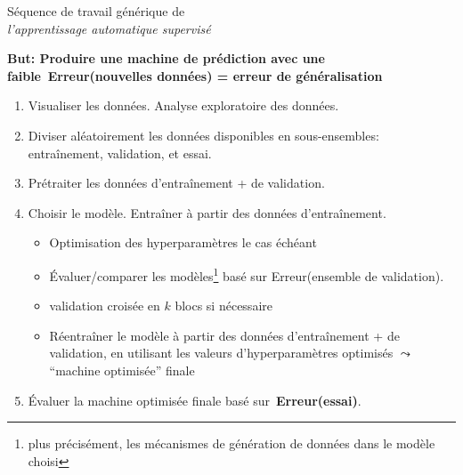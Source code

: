 
\renewcommand*{\thefootnote}{\fnsymbol{footnote}}
\setcounter{footnote}{1}


\begin{frame}{\vskip -0.5cm \normalsize S\'equence de travail g\'en\'erique de\\ \textit{\Large l'apprentissage automatique supervis\'e}}

\footnotesize

\begin{center}
\vskip -0.3cm
\textbf{\normalsize But: Produire une machine de pr\'ediction avec une\\faible \,{\color{blue}Erreur(nouvelles donn\'ees) = erreur de g\'en\'eralisation}}
\end{center}

\vskip -0.2cm
\begin{enumerate}
\item
	Visualiser les donn\'ees. Analyse exploratoire des donn\'ees.

\vskip -0.25cm
\item
	Diviser al\'eatoirement les donn\'ees disponibles en sous-ensembles:
	{\color{red}entra\^inement}, {\color{red}validation}, et {\color{red}essai}.

\vskip -0.25cm
\item
	Pr\'etraiter les donn\'ees d'entra\^inement + de validation.%

\vskip -0.25cm
\item
	Choisir le mod\`ele. Entra\^iner \`a partir des donn\'ees d'entra\^inement.
	{\scriptsize\begin{itemize}
	\item
		\vskip -0.1cm
		{\scriptsize{\color{red}Optimisation des hyperparam\`etres} le cas \'ech\'eant}
	\item
		{\scriptsize \'Evaluer/comparer les mod\`eles\!\!\footnote{\tiny\color{gray}\!\!plus pr\'ecis\'ement,
		les m\'ecanismes de g\'en\'eration de donn\'ees dans le mod\`ele choisi}
		bas\'e sur Erreur(ensemble de validation).}
	\item
		{\scriptsize{\color{red}validation crois\'ee en $k$ blocs} si n\'ecessaire}
	\item
		{\scriptsize R\'eentra\^iner le mod\`ele \`a partir des donn\'ees d'entra\^inement + de validation,
		en utilisant les valeurs d'hyperparam\`etres optimis\'es \;$\leadsto$\; ``machine optimis\'ee'' finale}
	\end{itemize}}

\vskip -0.25cm
\item
	\'Evaluer la machine optimis\'ee finale bas\'e sur \,\textbf{\color{blue}Erreur(essai)}.
\end{enumerate}

\end{frame}
\normalsize

